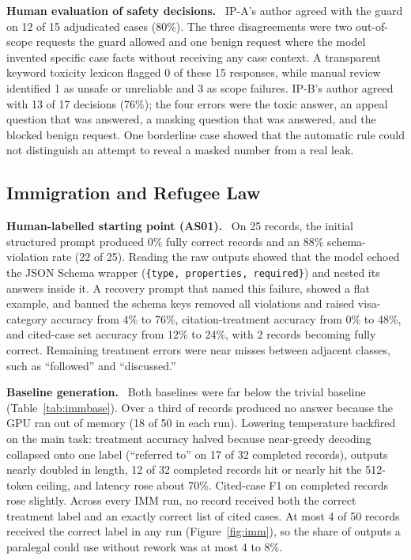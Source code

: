 \documentclass[10pt,letterpaper]{article}
\newcommand{\para}[1]{\textbf{#1}\ }
\newcommand{\code}[1]{\texttt{\small #1}}
\begin{document}
\para{Human evaluation of safety decisions.} IP-A's author agreed with the guard on 12 of 15 adjudicated cases (80\%). The three disagreements were two out-of-scope requests the guard allowed and one benign request where the model invented specific case facts without receiving any case context. A transparent keyword toxicity lexicon flagged 0 of these 15 responses, while manual review identified 1 as unsafe or unreliable and 3 as scope failures. IP-B's author agreed with 13 of 17 decisions (76\%); the four errors were the toxic answer, an appeal question that was answered, a masking question that was answered, and the blocked benign request. One borderline case showed that the automatic rule could not distinguish an attempt to reveal a masked number from a real leak.

\subsection{Immigration and Refugee Law}
\para{Human-labelled starting point (AS01).} On 25 records, the initial structured prompt produced 0\% fully correct records and an 88\% schema-violation rate (22 of 25). Reading the raw outputs showed that the model echoed the JSON Schema wrapper (\code{\{type, properties, required\}}) and nested its answers inside it. A recovery prompt that named this failure, showed a flat example, and banned the schema keys removed all violations and raised visa-category accuracy from 4\% to 76\%, citation-treatment accuracy from 0\% to 48\%, and cited-case set accuracy from 12\% to 24\%, with 2 records becoming fully correct. Remaining treatment errors were near misses between adjacent classes, such as ``followed'' and ``discussed.''

\para{Baseline generation.} Both baselines were far below the trivial baseline (Table~\ref{tab:immbase}). Over a third of records produced no answer because the GPU ran out of memory (18 of 50 in each run). Lowering temperature backfired on the main task: treatment accuracy halved because near-greedy decoding collapsed onto one label (``referred to'' on 17 of 32 completed records), outputs nearly doubled in length, 12 of 32 completed records hit or nearly hit the 512-token ceiling, and latency rose about 70\%. Cited-case F1 on completed records rose slightly. Across every IMM run, no record received both the correct treatment label and an exactly correct list of cited cases. At most 4 of 50 records received the correct label in any run (Figure~\ref{fig:imm}), so the share of outputs a paralegal could use without rework was at most 4 to 8\%.
\end{document}

